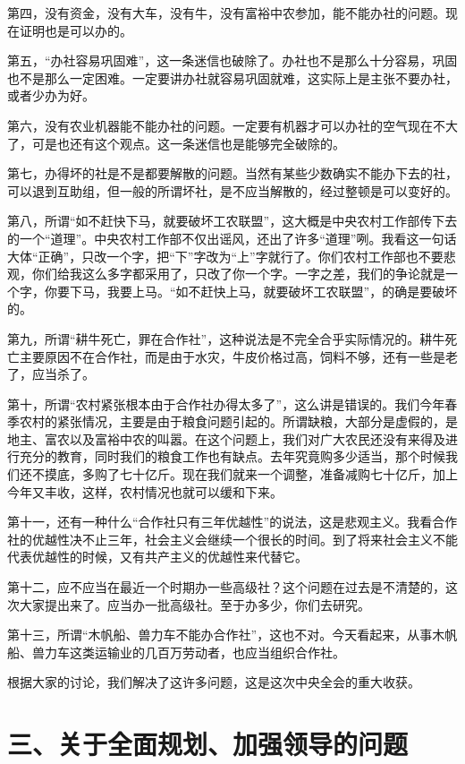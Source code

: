 第四，没有资金，没有大车，没有牛，没有富裕中农参加，能不能办社的问题。现在证明也是可以办的。

第五，“办社容易巩固难”，这一条迷信也破除了。办社也不是那么十分容易，巩固也不是那么一定困难。一定要讲办社就容易巩固就难，这实际上是主张不要办社，或者少办为好。

第六，没有农业机器能不能办社的问题。一定要有机器才可以办社的空气现在不大了，可是也还有这个观点。这一条迷信也是能够完全破除的。

第七，办得坏的社是不是都要解散的问题。当然有某些少数确实不能办下去的社，可以退到互助组，但一般的所谓坏社，是不应当解散的，经过整顿是可以变好的。

第八，所谓“如不赶快下马，就要破坏工农联盟”，这大概是中央农村工作部传下去的一个“道理”。中央农村工作部不仅出谣风，还出了许多“道理”咧。我看这一句话大体“正确”，只改一个字，把“下”字改为“上”字就行了。你们农村工作部也不要悲观，你们给我这么多字都采用了，只改了你一个字。一字之差，我们的争论就是一个字，你要下马，我要上马。“如不赶快上马，就要破坏工农联盟”，的确是要破坏的。

第九，所谓“耕牛死亡，罪在合作社”，这种说法是不完全合乎实际情况的。耕牛死亡主要原因不在合作社，而是由于水灾，牛皮价格过高，饲料不够，还有一些是老了，应当杀了。

第十，所谓“农村紧张根本由于合作社办得太多了”，这么讲是错误的。我们今年春季农村的紧张情况，主要是由于粮食问题引起的。所谓缺粮，大部分是虚假的，是地主、富农以及富裕中农的叫嚣。在这个问题上，我们对广大农民还没有来得及进行充分的教育，同时我们的粮食工作也有缺点。去年究竟购多少适当，那个时候我们还不摸底，多购了七十亿斤。现在我们就来一个调整，准备减购七十亿斤，加上今年又丰收，这样，农村情况也就可以缓和下来。

第十一，还有一种什么“合作社只有三年优越性”的说法，这是悲观主义。我看合作社的优越性决不止三年，社会主义会继续一个很长的时间。到了将来社会主义不能代表优越性的时候，又有共产主义的优越性来代替它。

第十二，应不应当在最近一个时期办一些高级社？这个问题在过去是不清楚的，这次大家提出来了。应当办一批高级社。至于办多少，你们去研究。

第十三，所谓“木帆船、兽力车不能办合作社”，这也不对。今天看起来，从事木帆船、兽力车这类运输业的几百万劳动者，也应当组织合作社。

根据大家的讨论，我们解决了这许多问题，这是这次中央全会的重大收获。

\section{三、关于全面规划、加强领导的问题}

